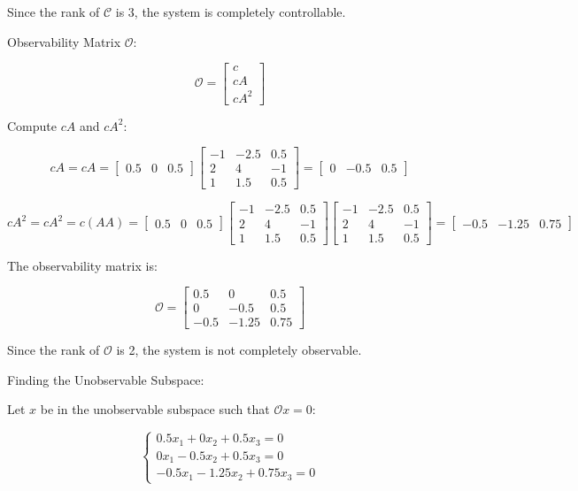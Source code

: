 \documentclass[12pt]{article}
\begin{document}
Since the rank of \(\mathcal{C}\) is 3, the system is completely controllable.

Observability Matrix \(\mathcal{O}\):

\[
\mathcal{O} = \begin{bmatrix} c \\ cA \\ cA^2 \end{bmatrix}
\]

Compute \( cA \) and \( cA^2 \):

\[
cA = c A = \begin{bmatrix}
0.5 & 0 & 0.5
\end{bmatrix}
\begin{bmatrix}
-1 & -2.5 & 0.5 \\
2 & 4 & -1 \\
1 & 1.5 & 0.5
\end{bmatrix}
= \begin{bmatrix}
0 & -0.5 & 0.5
\end{bmatrix}
\]

\[
cA^2 = c A^2 = c (A A) = \begin{bmatrix}
0.5 & 0 & 0.5
\end{bmatrix}
\begin{bmatrix}
-1 & -2.5 & 0.5 \\
2 & 4 & -1 \\
1 & 1.5 & 0.5
\end{bmatrix}
\begin{bmatrix}
-1 & -2.5 & 0.5 \\
2 & 4 & -1 \\
1 & 1.5 & 0.5
\end{bmatrix}
= \begin{bmatrix}
-0.5 & -1.25 & 0.75
\end{bmatrix}
\]

The observability matrix is:

\[
\mathcal{O} = \begin{bmatrix}
0.5 & 0 & 0.5 \\
0 & -0.5 & 0.5 \\
-0.5 & -1.25 & 0.75
\end{bmatrix}
\]

Since the rank of \(\mathcal{O}\) is 2, the system is not completely observable.

Finding the Unobservable Subspace:

Let \( x \) be in the unobservable subspace such that \( \mathcal{O} x = 0 \):

\[
\begin{cases}
0.5 x_1 + 0 x_2 + 0.5 x_3 = 0 \\
0 x_1 - 0.5 x_2 + 0.5 x_3 = 0 \\
-0.5 x_1 - 1.25 x_2 + 0.75 x_3 = 0
\end{cases}
\]
\end{document}
